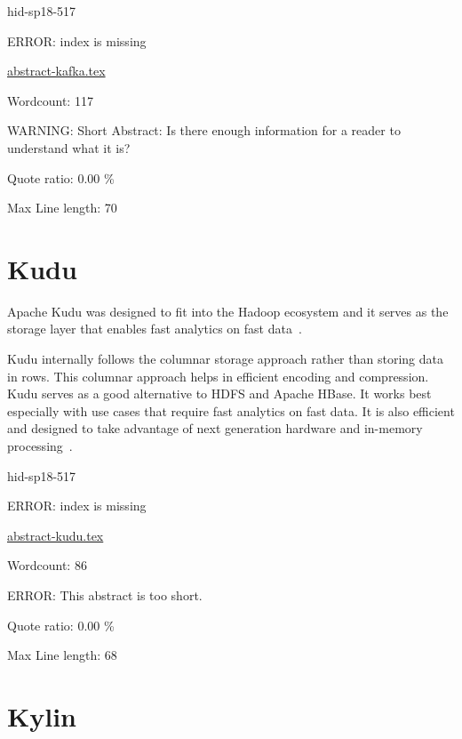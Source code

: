 \begin{IU}

hid-sp18-517

ERROR: index is missing

\href{https://github.com/cloudmesh-community/hid-sp18-517/blob/master//technology/abstract-kafka.tex}{abstract-kafka.tex}

 

Wordcount: 117

WARNING: Short Abstract: Is there enough information for a reader to understand what it is?


Quote ratio: 0.00 \%
 
Max Line length: 70
\end{IU}

\section{Kudu}

Apache Kudu was designed to fit into the Hadoop ecosystem and it 
serves as the storage layer that enables fast analytics on fast 
data~\cite{hid-sp18-517-ApacheKudu}.

Kudu internally follows the columnar storage approach rather than 
storing data in rows. This columnar approach helps in efficient 
encoding and compression. Kudu serves as a good alternative to HDFS 
and Apache HBase. It works best especially with use cases that 
require fast analytics on fast data. It is also efficient and 
designed to take advantage of next generation hardware and 
in-memory processing~\cite{hid-sp18-517-ApacheKudu}.





\begin{IU}

hid-sp18-517

ERROR: index is missing

\href{https://github.com/cloudmesh-community/hid-sp18-517/blob/master//technology/abstract-kudu.tex}{abstract-kudu.tex}

 

Wordcount: 86

ERROR: This abstract is too short.


Quote ratio: 0.00 \%
 
Max Line length: 68
\end{IU}

\section{Kylin}


